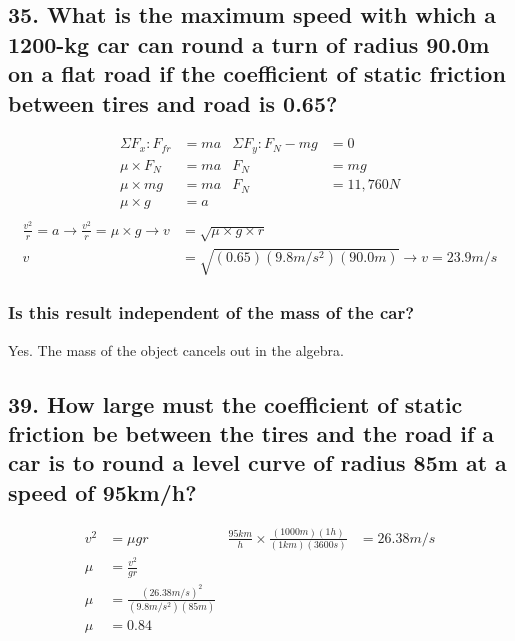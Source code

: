 \documentclass[12pt,a4paper,english]{article}
\begin{document}
\begin{flushleft}
  \subsection{35. What is the maximum speed with which a 1200-kg car can round a turn of radius 90.0m on a flat road if the coefficient of static friction between tires and road is 0.65? }
  \begin{align*}
    \Sigma F_x: F_{fr}&=ma
      &\Sigma F_y: F_N-mg&=0
      \\
    \mu\times F_N&=ma
                 &F_N&=mg
                 \\
    \mu\times mg&=ma
                &F_N&=11,760N
                \\
    \mu\times g&=a
    \\
  \end{align*}
  \begin{align*}
    \frac{v^2}{r}=a \rightarrow 
    \frac{v^2}{r}=\mu\times g \rightarrow
    v&=\sqrt{\mu\times g \times r}
    \\
    v&=\sqrt{(0.65)(9.8m/s^2)(90.0m)}
    \rightarrow
    v=23.9m/s
  \end{align*}
  \subsubsection{Is this result independent of the mass of the car?}
  Yes. The mass of the object cancels out in the algebra.
  \subsection{39. How large must the coefficient of static friction be between the tires and the road if a car is to round a level curve of radius 85m at a speed of 95km/h?}
  \begin{align*}
    v^2&=\mu gr & 
    \frac{95km}{h}\times\frac{(1000m)(1h)}{(1km)(3600s)}&=26.38m/s
    \\
    \mu&=\frac{v^2}{gr}
    \\
    \mu&=\frac{(26.38m/s)^2}{(9.8m/s^2)(85m)}
    \\
    \mu&=0.84
  \end{align*}

\end{flushleft}
\end{document}
